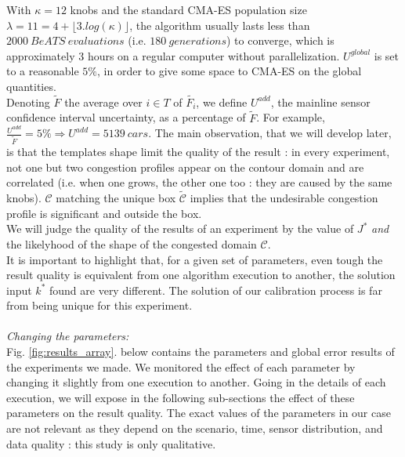 With $\kappa=12$ knobs and the standard CMA-ES population size $\lambda=11=4+\lfloor3.log(\kappa)\rfloor$, the algorithm usually lasts less than $2000\ BeATS\ evaluations$ (i.e. $180\ generations$) to converge, which is  approximately 3 hours on a regular computer without parallelization.
$U^{global}$ is set to a reasonable $5\%$, in order to give some space to CMA-ES on the global quantities.\\
Denoting $\widetilde{F}$ the average over $i\in T$ of $\widetilde{F_{i}}$, we define $U^{add}$, the mainline sensor confidence interval uncertainty, as a percentage of $\widetilde{F}$. For example, $\frac{U^{add}}{\widetilde{F}}=5\% \Rightarrow U^{add}=5139\ cars$.
The main observation, that we will develop later, is that the templates shape limit the quality of the result : in every experiment, not one but two congestion profiles appear on the contour domain and are correlated (i.e. when one grows, the other one too : they are caused by the same knobs).  $\mathscr{C}$ matching the unique box $\widetilde{\mathscr{C}}$ implies that the undesirable congestion profile is significant and outside the box.\\
We will judge the quality of the results of an experiment by the value of $J^{*}$ \emph{and} the likelyhood of the shape of the congested domain $\mathscr{C}$. \\
It is important to highlight that, for a given set of parameters, even tough the result quality is equivalent from one algorithm execution to another, the solution input $k^{*}$ found are very different. The solution of our calibration process is far from being unique for this experiment.\\
\\
\emph{Changing the parameters:}\\
Fig. \ref{fig:results_array}. below contains the parameters and global error results of the experiments we made. We monitored the effect of each parameter by changing it slightly from one execution to another. Going in the details of each execution, we will expose in the following sub-sections the effect of these parameters on the result quality. The exact values of the parameters in our case are not relevant as they depend on the scenario, time, sensor distribution, and data quality : this study is only qualitative.\\

